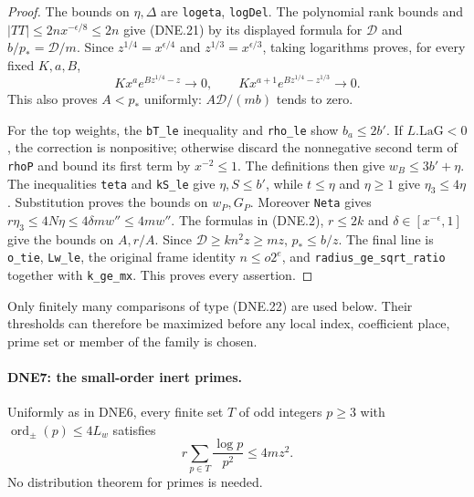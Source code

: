 \documentclass[11pt,a4paper]{article}
\numberwithin{equation}{section}
\theoremstyle{remark}\newtheorem{remark}[theorem]{Remark}
\begin{document}
\begin{proof}
The bounds on $\eta,\Delta$ are \texttt{logeta}, \texttt{log\allowbreak Del}.
The polynomial rank bounds and $|TT|\le2n x^{-\epsilon/8}\le2n$
give (DNE.21) by its displayed formula for $\mathcal D$ and
$b/p_*=\mathcal D/m$.
Since $z^{1/4}=x^{\epsilon/4}$ and
$z^{1/3}=x^{\epsilon/3}$, taking logarithms proves, for every
fixed $K,a,B$,
\[
 Kx^a e^{Bz^{1/4}-z}\longrightarrow0,
 \qquad Kx^{a+1}e^{Bz^{1/4}-z^{1/3}}\longrightarrow0.     \tag{DNE.22}
\]
This also proves $A<p_*$ uniformly: $A\mathcal D/(mb)$ tends to zero.

For the top weights, the \texttt{b\allowbreak T\_\allowbreak le} inequality and
\texttt{rho\_\allowbreak le} show $b_a\le2b'$.  If $L.\mathrm{LaG}<0$,
the correction is nonpositive; otherwise discard the nonnegative
second term of \texttt{rho\allowbreak P} and bound its first term by
$x^{-2}\le1$.  The definitions then give $w_B\le3b'+\eta$.
The inequalities \texttt{teta} and \texttt{k\allowbreak S\_\allowbreak le} give
$\eta,S\le b'$, while $t\le\eta$ and $\eta\ge1$ give
$\eta_3\le4\eta$.  Substitution proves the bounds on $w_P,G_P$.
Moreover \texttt{Neta} gives
$r\eta_3\le4N\eta\le4\delta m w''\le4m w''$.
The formulas in (DNE.2), $r\le2k$ and
$\delta\in[x^{-\epsilon},1]$ give the bounds on $A,r/A$.
Since $\mathcal D\ge kn^2z\ge mz$, $p_*\le b/z$.
The final line is \texttt{o\_\allowbreak tie}, \texttt{Lw\_\allowbreak le}, the original
frame identity $n\le o2^e$, and \texttt{radius\_\allowbreak ge\_\allowbreak sqrt\_\allowbreak ratio}
together with \texttt{k\_\allowbreak ge\_\allowbreak mx}.  This proves every assertion.
\end{proof}

Only finitely many comparisons of type (DNE.22) are used below.
Their thresholds can therefore be maximized before any local index,
coefficient place, prime set or member of the family is chosen.

\paragraph{DNE7: the small-order inert primes.}
\label{claim:DNE7}
Uniformly as in DNE6, every finite set $T$ of odd integers $p\ge3$
with $\operatorname{ord}_{\pm}(p)\le4L_w$ satisfies
\[
           r\sum_{p\in T}\frac{\log p}{p^2}\le4mz^2.     \tag{DNE.23}
\]
No distribution theorem for primes is needed.
\end{document}
